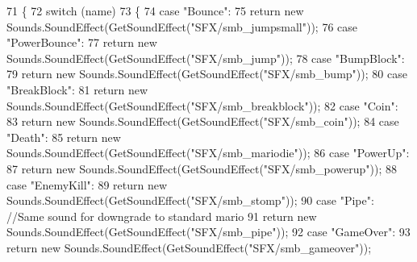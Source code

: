 \begin{DoxyCode}
71         \{
72             \textcolor{keywordflow}{switch} (name)
73             \{
74                 \textcolor{keywordflow}{case} \textcolor{stringliteral}{"Bounce"}:
75                     \textcolor{keywordflow}{return} \textcolor{keyword}{new} Sounds.SoundEffect(GetSoundEffect(\textcolor{stringliteral}{"SFX/smb\_jumpsmall"}));
76                 \textcolor{keywordflow}{case} \textcolor{stringliteral}{"PowerBounce"}:
77                     \textcolor{keywordflow}{return} \textcolor{keyword}{new} Sounds.SoundEffect(GetSoundEffect(\textcolor{stringliteral}{"SFX/smb\_jump"}));
78                 \textcolor{keywordflow}{case} \textcolor{stringliteral}{"BumpBlock"}:
79                     \textcolor{keywordflow}{return} \textcolor{keyword}{new} Sounds.SoundEffect(GetSoundEffect(\textcolor{stringliteral}{"SFX/smb\_bump"}));
80                 \textcolor{keywordflow}{case} \textcolor{stringliteral}{"BreakBlock"}:
81                     \textcolor{keywordflow}{return} \textcolor{keyword}{new} Sounds.SoundEffect(GetSoundEffect(\textcolor{stringliteral}{"SFX/smb\_breakblock"}));
82                 \textcolor{keywordflow}{case} \textcolor{stringliteral}{"Coin"}:
83                     \textcolor{keywordflow}{return} \textcolor{keyword}{new} Sounds.SoundEffect(GetSoundEffect(\textcolor{stringliteral}{"SFX/smb\_coin"}));
84                 \textcolor{keywordflow}{case} \textcolor{stringliteral}{"Death"}:
85                     \textcolor{keywordflow}{return} \textcolor{keyword}{new} Sounds.SoundEffect(GetSoundEffect(\textcolor{stringliteral}{"SFX/smb\_mariodie"}));
86                 \textcolor{keywordflow}{case} \textcolor{stringliteral}{"PowerUp"}:
87                     \textcolor{keywordflow}{return} \textcolor{keyword}{new} Sounds.SoundEffect(GetSoundEffect(\textcolor{stringliteral}{"SFX/smb\_powerup"}));
88                 \textcolor{keywordflow}{case} \textcolor{stringliteral}{"EnemyKill"}:
89                     \textcolor{keywordflow}{return} \textcolor{keyword}{new} Sounds.SoundEffect(GetSoundEffect(\textcolor{stringliteral}{"SFX/smb\_stomp"}));
90                 \textcolor{keywordflow}{case} \textcolor{stringliteral}{"Pipe"}: \textcolor{comment}{//Same sound for downgrade to standard mario}
91                     \textcolor{keywordflow}{return} \textcolor{keyword}{new} Sounds.SoundEffect(GetSoundEffect(\textcolor{stringliteral}{"SFX/smb\_pipe"}));
92                 \textcolor{keywordflow}{case} \textcolor{stringliteral}{"GameOver"}:
93                     \textcolor{keywordflow}{return} \textcolor{keyword}{new} Sounds.SoundEffect(GetSoundEffect(\textcolor{stringliteral}{"SFX/smb\_gameover"}));

\end{DoxyCode}
